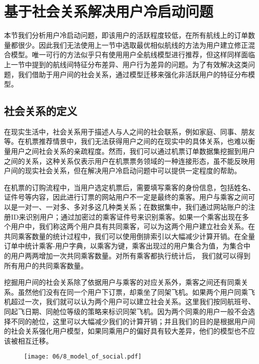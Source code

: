 \section{基于社会关系解决用户冷启动问题}

本节我们分析用户冷启动问题，即该用户的活跃程度较低，在所有航线上的订单数量都很少。因此我们无法使用上一节中选取最优相似航线的方法为用户建立修正混合模型。唯一可行的方法似乎只有使用用户全航线模型进行推荐，但这样同样面临上一节中提到的航线间特征分布差异、用户行为差异的问题。为了有效解决这类问题，我们借助于用户间的社会关系，通过模型迁移来强化非活跃用户的特征分布模型。


\subsection{社会关系的定义}
在现实生活中，社会关系用于描述人与人之间的社会联系，例如家庭、同事、朋友等。在机票推荐情景中，我们无法获得用户之间的在现实中的具体关系，也难以衡量用户之间社会关系的亲疏程度。然而，我们可以通过机票订单数据集挖掘到用户之间的关系，这种关系仅表示用户在机票票务领域的一种连接形态，虽不能反映用户间的现实社会关系，但在解决用户冷启动问题中可以提供一定程度的帮助。

在机票的订购流程中，当用户选定机票后，需要填写乘客的身份信息，包括姓名、证件号等内容，因此进行订票的网站用户不一定是最终的乘客。用户与乘客之间可以是一对一、一对多、多对多这几种类关系；在数据集中，我们通过网站账户的注册ID来识别用户；通过加密过的乘客证件号来识别乘客。如果一个乘客出现在多个用户中，我们称这两个用户具有共同乘客，可以为这两个用户建立社会关系。在共同乘客数量的统计过程中，我们可以使用倒排索引以大幅减少计算开销。在全量订单中统计乘客-用户字典，以乘客为键，乘客出现过的用户集合为值，为集合中的用户两两增加一次共同乘客数量。对所有乘客都执行统计后，
我们就可以得到所有用户的共同乘客数量。

挖掘用户间的社会关系除了依据用户与乘客的对应关系外，乘客之间还有同乘关系。虽然他们没有在同一个用户下订票，却乘坐了同架飞机。如果两个用户同乘飞机超过一次，我们就可以认为两个用户可以建立社会关系。这里我们按同航班号、同起飞日期、同舱位等级的策略来标识同架飞机。因为两个同乘的用户一般不会选择不同的舱位，这里可以大幅减少我们的计算开销；并且我们的目的是根据用户间的社会关系强化用户模型，如果同乘用户的偏好具有较大差异，他们的模型也不应该被相互迁移。

\begin{figure}[!h]
 \centering
 \texttt{[image: 06/8\_model\_of\_social.pdf]}
\end{figure}

